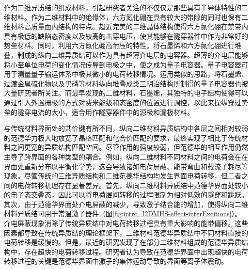     作为二维异质结的组成材料，引起研究者关注的不仅仅是那些具有半导体特性的二维材料。作为二维材料中的绝缘体，六方氮化硼在具有较大的带隙的同时也保有二维材料高质量面内结构的特点。趋近完美的二维晶体结构使得六方氮化硼在禁带内具有极低的缺陷态密度以及较高的击穿电压，使其能够在隧穿器件中作为非常好的势垒材料。同时，利用六方氮化硼高耐压的特性，将石墨烯和六方氮化硼进行堆叠，制成的纵向二维异质结可以作为具有超薄介电层的电容器。超薄的介电层能够将小至单位电荷的变化情况传导到电极之中，使之成为量子电容器。量子电容器可用于测量量子输运体系中极其微小的电荷转移情况。运用类似的思路，将石墨烯、过渡金属硫化物以及黑磷等材料纵向堆叠成类三明治结构所制得的量子电容器也被大量研究者所关注。而最早发现的二维材料，石墨烯，其独特的电子结构使得可以通过引入外置栅极的方式对费米能级和态密度的位置进行调控，以此来操纵穿过势垒的隧穿电流的大小，适合用作隧穿器件中的源极和漏极材料。

    与传统材料界面处的共价键有所不同，纵向二维材料异质结构中各层之间相对较弱的范德华力极大地放宽了晶格匹配和化合价匹配的要求，最终实现了相比于传统材料之间更宽的异质结构匹配空间。尽管作用的强度较弱，但范德华的相互作用仍然主导了跨界面的各种类型的耦合。例如，纵向二维材料不同材料之间的电荷会在在界面处重新分布以平衡化学势，这会导致诸如电荷屏蔽、能带弯曲和载流子耗尽等现象。尽管传统的三维异质结构和二维范德华结构均发生界面电荷转移，但二者之间的电荷转移机理存在显著差异。首先，纵向二维材料异质结中范德华界面处较小的电子态交叠态，因此可以将电荷层间转移的过程限制为相对低效的隧穿和跳跃。其次，由于范德华界面处介电屏蔽的减少，导致激子结合能的增加，使得纵向二维材料异质结可用于常温激子器件（图\ref{fig:intro_l2DMHS-effect-interExcitions}）。介电屏蔽现象消除了传统异质结中对电荷转移过程具有重大影响的能带偏移。这些因素都导致在传统异质结的理论框架下，二维材料范德华异质结中不同材料直接的电荷转移是缓慢的。但是，最近的研究发现了在部分二维材料组成的范德华异质结构中，存在超快的电荷转移过程。研究者认为导致在范德华界面中出现超快的电荷转移过程的关键是范德华界面中激子的集体运动导致的界面等离子体震动。

